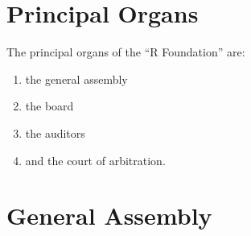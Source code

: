 \documentclass[a4paper]{article}
\newcommand{\RF}{``R Foundation''}
\begin{document}
\section{Principal Organs}

The principal organs of the \RF{} are: 
\begin{enumerate}
 \item the general assembly
 \item the board
 \item the auditors
 \item and the court of arbitration.
\end{enumerate}


\section{General Assembly}
\end{document}
